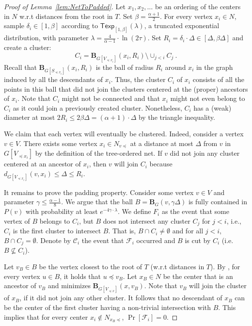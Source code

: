 \documentclass{theoretics}
\newcommand{\Texp}{\mathsf{Texp}}
\def\ball{\mathbf{B}}
\begin{document}
\begin{proof}[Proof of Lemma~\ref{lem:NetToPadded}]	
	Let $x_1,x_2,\dots$ be an ordering of the centers in $N$ w.r.t distances from the root in $T$.
	Set $\beta=\frac{\alpha+1}{2}$.
	For every vertex $x_i\in N$, sample $\delta_i\in[1,\beta]$ according to $\Texp_{[1,\beta]}(\lambda)$, a truncated exponential distribution, with parameter $\lambda=\frac{4}{\alpha-1}\cdot\ln (2\tau)$. Set $R_i=\delta_i\cdot\Delta\in[\Delta,\beta\Delta]$ and create a cluster:
	\[
	C_{i}=\ball_{G[V_{\preceq x_{i}}]}(x_i,R_{i})\setminus\cup_{j<i}C_{j}~.
	\]
	Recall that $\ball_{G[S_{\preceq x_i}]}(x_i,R_{i})$ is the ball of radius $R_i$ around $x_i$ in the graph induced by all the descendants of $x_i$. Thus, the cluster $C_{i}$ of $x_i$ consists of all the points in this ball that did not join the clusters centered at the (proper) ancestors of $x_i$.
	Note that  $C_i$ might not be connected and that $x_i$ might not even belong to $C_i$ as it could join a previously created cluster.  Nonetheless, $C_i$ has a (weak) diameter at most $2R_i \leq 2\beta\Delta=(\alpha+1)\cdot\Delta$ by the triangle inequality.  
	
	We claim that each vertex will eventually be clustered. Indeed, consider a vertex $v\in V$. There exists some vertex $x_i\in N_{v\preceq}$ at a distance at most $\Delta$ from $v$ in $G[V_{\preceq x_i}]$ by the definition of the tree-ordered net.  If $v$ did not join any cluster centered at an ancestor of $x_i$, then $v$ will join $C_i$ because  $d_{G[V_{\preceq x_i}]}(v,x_i)\le \Delta\le R_i$. 
	
	
	It remains to prove the padding property. Consider some vertex $v\in V$ and parameter $\gamma\le\frac{\alpha-1}{8}$. We argue that the ball $B=\ball_G(v,\gamma \Delta)$ is fully contained in $P(v)$ with probability at least $e^{-4\gamma\cdot\lambda}$. We define $F_i$ as the event that some vertex of $B$ belongs to $C_i$, but $B$ does not intersect any cluster $C_j$ for $j < i$, i.e., $C_i$ is the first cluster to intersect $B$. That is, $B\cap C_{i}\ne\emptyset$ and for all $j<i$, $B\cap C_j=\emptyset$. Denote by $\mathcal{C}_i$ the event that $\mathcal{F}_i$ occurred and $B$ is cut by $C_i$ (i.e. $B\nsubseteq C_i$).
	
	
	Let $v_B\in B$ be the vertex closest to the root of $T$ (w.r.t distances in $T$). By , for every vertex $u\in B$, it holds that $u\preceq v_B$. Let $x_B\in N$ be the center that is an ancestor of $v_B$ and minimizes $\ball_{G[V_{\preceq x}]}(x,v_B)$.  Note that $v_B$ will join the cluster of $x_B$, if it did not join any other cluster. It follows that no descendant of $x_B$ can be the center of the first cluster having a non-trivial intersection with $B$. This implies that for every center $x_i\notin N_{x_B\preceq}$, $\Pr[\mathcal{F}_i]=0$.
	

\end{proof}
\end{document}
